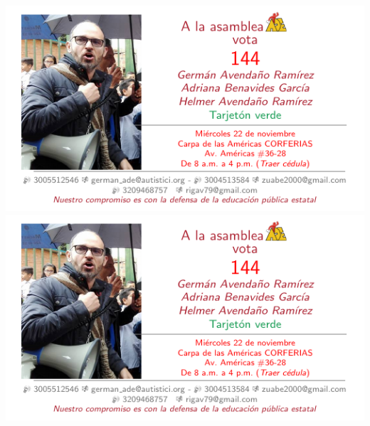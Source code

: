 \documentclass[10pt,letterpaper]{minimal}
\begin{document}
\thispagestyle{empty}
\noindent
\begin{center}
\hspace{.5mm}\includegraphics[scale=1]{Tarjeta.pdf} \includegraphics[scale=1]{Tarjeta.pdf} \vspace{1.1mm}


\end{center}
\end{document}
